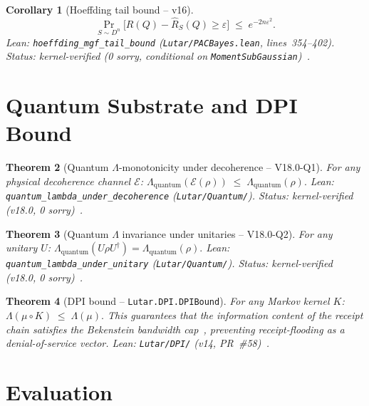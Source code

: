 \documentclass[11pt,letterpaper]{article}
\newtheorem{theorem}{Theorem}[section]
\newtheorem{corollary}[theorem]{Corollary}
\theoremstyle{definition}
\theoremstyle{remark}
\begin{document}
\begin{corollary}[Hoeffding tail bound -- v16]
\label{cor:hoeffding}
\[
  \Pr_{S \sim D^n}\!\bigl[R(Q) - \hat{R}_S(Q) \ge \varepsilon\bigr]
  \;\le\; e^{-2n\varepsilon^2}.
\]
\textup{Lean:} \texttt{hoeffding\_mgf\_tail\_bound}
(\texttt{Lutar/PACBayes.lean}, lines~354--402).
Status: kernel-verified (0 sorry, conditional on \texttt{MomentSubGaussian})~\cite{Hoeffding1963}.
\end{corollary}

\section{Quantum Substrate and DPI Bound}
\label{sec:quantum}

\begin{theorem}[Quantum \(\Lambda\)-monotonicity under decoherence -- V18.0-Q1]
\label{thm:quantum-mono}
For any physical decoherence channel \(\mathcal{E}\):
\(
  \Lambda_{\mathrm{quantum}}(\mathcal{E}(\rho)) \;\le\;
  \Lambda_{\mathrm{quantum}}(\rho).
\)
\textup{Lean:} \texttt{quantum\_lambda\_under\_decoherence}
(\texttt{Lutar/Quantum/}).
Status: kernel-verified (v18.0, 0 sorry)~\cite{LutarThesisV18}.
\end{theorem}

\begin{theorem}[Quantum \(\Lambda\) invariance under unitaries -- V18.0-Q2]
\label{thm:quantum-unitary}
For any unitary \(U\):
\(
  \Lambda_{\mathrm{quantum}}(U \rho U^\dagger)
  = \Lambda_{\mathrm{quantum}}(\rho).
\)
\textup{Lean:} \texttt{quantum\_lambda\_under\_unitary}
(\texttt{Lutar/Quantum/}).
Status: kernel-verified (v18.0, 0 sorry)~\cite{LutarThesisV18}.
\end{theorem}

\begin{theorem}[DPI bound -- \texttt{Lutar.DPI.DPIBound}]
\label{thm:dpi}
For any Markov kernel \(K\):
\(
  \Lambda(\mu \circ K) \;\le\; \Lambda(\mu).
\)
This guarantees that the information content of the receipt chain
satisfies the Bekenstein bandwidth cap~\cite{Bekenstein1981},
preventing receipt-flooding as a denial-of-service vector.
\textup{Lean:} \texttt{Lutar/DPI/} (v14, PR~\#58)~\cite{LutarThesisV14}.
\end{theorem}

\section{Evaluation}
\label{sec:eval}
\end{document}
